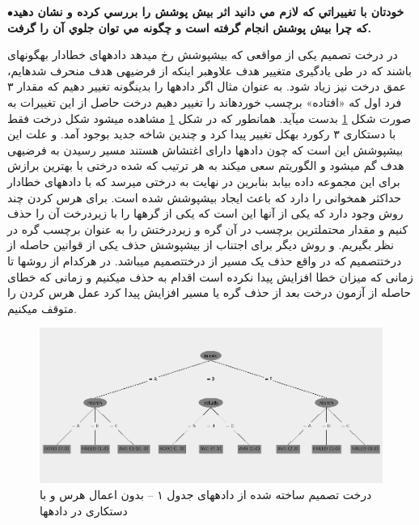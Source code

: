 \documentclass[10pt,a4paper]{article}
\newcommand{\نیمفاصله}{\halfspace}
\renewcommand{\ }{\halfspace}
\newenvironment{q}[1]{\noindent\textbf{$\bullet $\hspace{1em}#1}\par}{\par}
\newcommand{\مق}{\lr}
\newcommand{\فایندس}{\lr{Find-S} }
\begin{document}
\begin{q}{خودتان با تغييراتي که لازم مي دانید اثر بيش پوشش را بررسي کرده و نشان دهيد که چرا بيش پوشش انجام گرفته است و چگونه مي توان جلوي آن را گرفت.}
در درخت تصمیم یکی از مواقعی که بیش\ پوشش رخ می\ دهد داده\ های خطادار به\ گونه\ ای باشند که در طی یادگیری متغییر هدف علاوه\ بر اینکه از فرضیه\ ی هدف منحرف شده\ ایم، عمق درخت نیز زیاد شود. به عنوان مثال اگر داده\ ها را بدین\ گونه تغییر دهیم که مقدار ۳ فرد اول که «افتاده» برچسب خورده\ اند را تغییر دهیم درخت حاصل از این تغییرات به صورت شکل
\ref{tr:overfitting}
بدست می\ آید. همان\ طور که در شکل
\ref{tr:overfitting}
مشاهده می\ شود شکل درخت فقط با دست\ کاری ۳ رکورد به\ کل تغییر پیدا کرد و چندین شاخه جدید بوجود آمد. و علت این بیش\ پوشش این است که چون داده\ ها دارای اغتشاش هستند مسیر رسیدن به فرضیه\ ی هدف گم می\ شود و الگوریتم سعی می\ کند به هر ترتیب که شده درختی با بهترین برازش برای این مجموعه داده بیابد بنابرین در نهایت به درختی می\ رسد که با داده\ های خطادار حداکثر همخوانی را دارد که باعث ایجاد بیش\ پوشش شده است. برای هرس کردن چند روش وجود دارد که یکی از آن\ ها این است که یکی از گره\ ها را با زیردرخت آن را حذف کنیم و مقدار محتمل\ ترین برچسب در آن گره و زیردرختش را به عنوان برچسب گره در نظر بگیریم. و روش دیگر برای اجتناب از بیش\ پوشش حذف یکی از قوانین حاصله از درخت\ تصمیم که در واقع حذف یک مسیر از درخت\ تصمیم می\ باشد. در هرکدام از روش\ ها تا زمانی که میزان خطا افزایش پیدا نکرده است اقدام به حذف می\ کنیم و زمانی که خطای حاصله از آزمون درخت بعد از حذف گره یا مسیر افزایش پیدا کرد عمل هرس کردن را متوقف می\ کنیم.
\begin{figure}[h!]
\centering
\includegraphics[width=.75\textwidth]{overfitting}
\caption{درخت تصمیم ساخته شده از داده\ های جدول ۱ -- بدون اعمال هرس و با دست\ کاری در داده\ ها}\label{tr:overfitting}
\end{figure}
\end{q}
\end{document}

